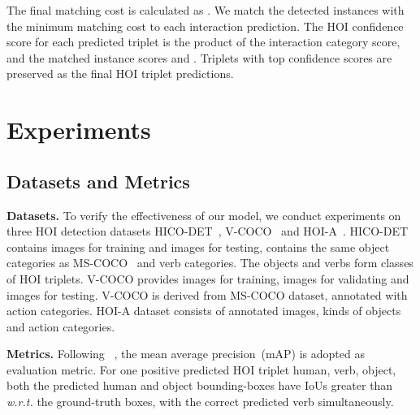 \documentclass[final]{cvpr}
\begin{document}
The final matching cost is calculated as . We match the detected instances with the minimum matching cost to each interaction prediction. The HOI confidence score for each predicted triplet is the product of the interaction category score, and the matched instance scores  and . Triplets with top  confidence scores are preserved as the final HOI triplet predictions.
\section{Experiments}
\vspace{-1.5mm}\subsection{Datasets and Metrics}\vspace{-1mm}
\noindent\textbf{Datasets.}
To verify the effectiveness of our model, we conduct experiments on three HOI detection datasets HICO-DET~\cite{chao2018learning}, V-COCO~\cite{gupta2015visual} and HOI-A~\cite{liao2020ppdm}. HICO-DET contains  images for training and  images for testing, contains the same  object categories as MS-COCO~\cite{lin2014microsoft} and  verb categories. The objects and verbs form  classes of HOI triplets. V-COCO provides  images for training,  images for validating and  images for testing. V-COCO is derived from MS-COCO dataset, annotated with  action categories. HOI-A dataset consists of  annotated images,  kinds of objects and  action categories.

\vspace{0.5mm}\noindent\textbf{Metrics.}
Following ~\cite{chao2018learning}, the mean average precision~(mAP) is adopted as evaluation metric. For one positive predicted HOI triplet human, verb, object, both the predicted human and object bounding-boxes have IoUs greater than  \emph{w.r.t.} the ground-truth boxes, with the correct predicted verb simultaneously.
\end{document}

